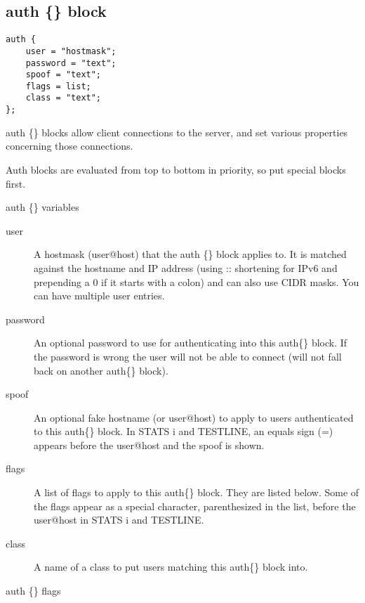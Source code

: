 \subsection{auth \{\} block}

\begin{verbatim}
auth {
	user = "hostmask";
	password = "text";
	spoof = "text";
	flags = list;
	class = "text";
};\end{verbatim}

	auth \{\} blocks allow client connections to the server, and set
	various properties concerning those connections.

	Auth blocks are evaluated from top to bottom in priority, so put
	special blocks first.


{\sc auth \{\} variables}
\nopagebreak

\noindent
\begin{description}
\item[{user}]
	A hostmask (user@host) that the auth \{\} block applies to. It is
	matched against the hostname and IP address (using :: shortening for
	IPv6 and prepending a 0 if it starts with a colon) and can also use
	CIDR masks. You can have multiple user entries.

\item[{password}]
	An optional password to use for authenticating into this auth\{\}
	block. If the password is wrong the user will not be able to connect
	(will not fall back on another auth\{\} block).

\item[{spoof}]
	An optional fake hostname (or user@host) to apply to users
	authenticated to this auth\{\} block. In STATS i and TESTLINE, an
	equals sign (=) appears before the user@host and the spoof is shown.

\item[{flags}]
	A list of flags to apply to this auth\{\} block. They are listed below.
	Some of the flags appear as a special character, parenthesized in the
	list, before the user@host in STATS i and TESTLINE.

\item[{class}]
	A name of a class to put users matching this auth\{\} block into.
\end{description}

{\sc auth \{\} flags}
\nopagebreak

